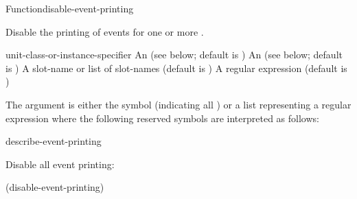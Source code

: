 \documentclass[10pt,twoside,english,pdftex]{article}
\begin{document}

\begin{functiondoc}{Function}{disable-event-printing}%
  {\nobr{[\var{event-class-specifier\/}}
    \nobr{[\var{unit-class-or-instance-specifier\/}]]}
    }
%
%


\fnsyntax

\fnpurpose Disable the printing of events for one or more
. 

\fnpackage {}

\fnmodule {}

\fnargs
\begin{args}{unit-class-or-instance-specifier}
 An  
(see below; default is )
 An 
(see below; default is )
 A slot-name or list of slot-names
(default is )
 A  regular expression
(default is \code{(*)})
\end{args}

\fndsyntax
\W\supp\tabletop
\eventclassspec
\subeventingspec
\syntaxsep
\unitclassinstancespec
\subclassingspec

\fndescription 
The  argument is either the symbol  (indicating
all ) or a list representing a regular
expression where the following reserved symbols are interpreted as
follows:
\spaceinstanceregexp

\begin{alsos}{describe-event-printing}
\end{alsos}

\fnexample
Disable all event printing:
%
\W\supp
\begin{example}
  (disable-event-printing)
\end{example}

\fnnote
\instanceevfnsnyi

\end{functiondoc}
\end{document}
